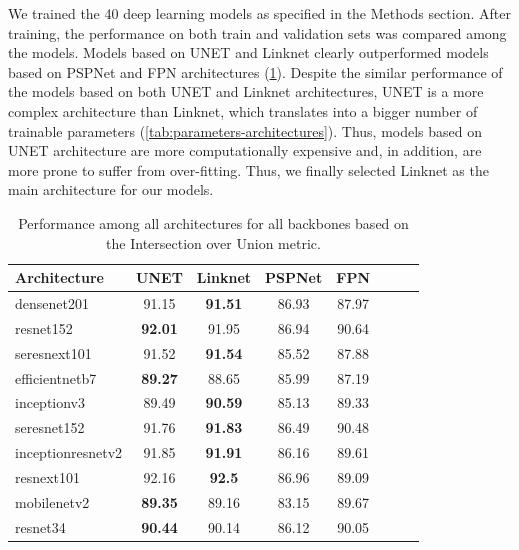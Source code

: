 We trained the 40 deep learning models as specified in the Methods
section. After training, the performance on both train and validation sets was
compared among the models. Models based on UNET and Linknet clearly
outperformed models based on PSPNet and FPN architectures
(\cref{tab:metrics-architectures}). Despite the similar performance of the
models based on both UNET and Linknet architectures, UNET is a more complex
architecture than Linknet, which translates into a bigger number of trainable
parameters (\cref{tab:parameters-architectures}). Thus, models based on UNET
architecture are more computationally expensive and, in addition, are more
prone to suffer from over-fitting. Thus, we finally selected Linknet as the
main architecture for our models.

\begin{table}[H]
    \centering
    \caption[Model performance comparison]{Performance among all architectures
        for all backbones based on
        the Intersection over Union metric.}
    \label{tab:metrics-architectures}
    \begin{tabular}{lccccccc}
        \toprule
        \textbf{Architecture} & \textbf{UNET}  & \textbf{Linknet} &
        \textbf{PSPNet}       &
        \textbf{FPN}
        \\
        \midrule
        densenet201           & 91.15          & \textbf{91.51}   & 86.93
                              & 87.97
        \\
        resnet152             & \textbf{92.01} & 91.95            & 86.94
                              & 90.64
        \\
        seresnext101          & 91.52          & \textbf{91.54}   & 85.52
                              & 87.88
        \\
        efficientnetb7        & \textbf{89.27} & 88.65            & 85.99
                              & 87.19
        \\
        inceptionv3           & 89.49          & \textbf{90.59}   & 85.13
                              & 89.33
        \\
        seresnet152           & 91.76          & \textbf{91.83}   & 86.49
                              & 90.48
        \\
        inceptionresnetv2     & 91.85          & \textbf{91.91}   & 86.16
                              & 89.61
        \\
        resnext101            & 92.16          & \textbf{92.5}    & 86.96
                              & 89.09
        \\
        mobilenetv2           & \textbf{89.35} & 89.16            & 83.15
                              & 89.67
        \\
        resnet34              & \textbf{90.44} & 90.14            & 86.12
                              & 90.05
        \\
        \bottomrule
    \end{tabular}
\end{table}

